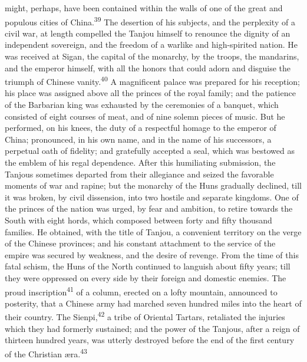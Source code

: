 might, perhaps, have been contained within the walls of one of
the great and populous cities of China.\textsuperscript{39} The desertion of his
subjects, and the perplexity of a civil war, at length compelled
the Tanjou himself to renounce the dignity of an independent
sovereign, and the freedom of a warlike and high-spirited nation.
He was received at Sigan, the capital of the monarchy, by the
troops, the mandarins, and the emperor himself, with all the
honors that could adorn and disguise the triumph of Chinese
vanity.\textsuperscript{40} A magnificent palace was prepared for his reception;
his place was assigned above all the princes of the royal family;
and the patience of the Barbarian king was exhausted by the
ceremonies of a banquet, which consisted of eight courses of
meat, and of nine solemn pieces of music. But he performed, on
his knees, the duty of a respectful homage to the emperor of
China; pronounced, in his own name, and in the name of his
successors, a perpetual oath of fidelity; and gratefully accepted
a seal, which was bestowed as the emblem of his regal dependence.
After this humiliating submission, the Tanjous sometimes departed
from their allegiance and seized the favorable moments of war and
rapine; but the monarchy of the Huns gradually declined, till it
was broken, by civil dissension, into two hostile and separate
kingdoms. One of the princes of the nation was urged, by fear and
ambition, to retire towards the South with eight hords, which
composed between forty and fifty thousand families. He obtained,
with the title of Tanjou, a convenient territory on the verge of
the Chinese provinces; and his constant attachment to the service
of the empire was secured by weakness, and the desire of revenge.
From the time of this fatal schism, the Huns of the North
continued to languish about fifty years; till they were oppressed
on every side by their foreign and domestic enemies. The proud
inscription\textsuperscript{41} of a column, erected on a lofty mountain,
announced to posterity, that a Chinese army had marched seven
hundred miles into the heart of their country. The Sienpi,\textsuperscript{42} a
tribe of Oriental Tartars, retaliated the injuries which they had
formerly sustained; and the power of the Tanjous, after a reign
of thirteen hundred years, was utterly destroyed before the end
of the first century of the Christian æra.\textsuperscript{43}


